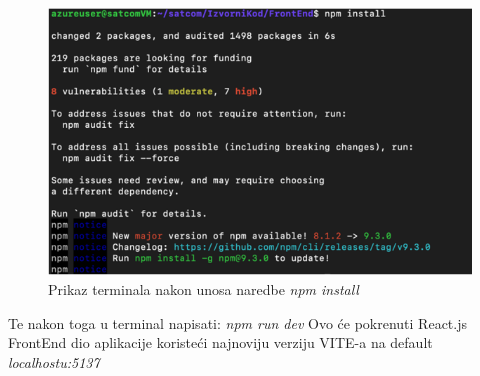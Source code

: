 			
			\begin{figure}[H]
				\includegraphics[width=\textwidth]{slike/npm install.PNG} %
				\centering
				\caption{Prikaz terminala nakon unosa naredbe \textit{npm install} }
				\label{fig:npminstall1}
			\end{figure}
			
			\eject
 	
            Te nakon toga u terminal napisati: 
            \textit{npm run dev}
            Ovo će pokrenuti React.js FrontEnd dio aplikacije koristeći najnoviju verziju VITE-a na default \textit{localhostu:5137}
